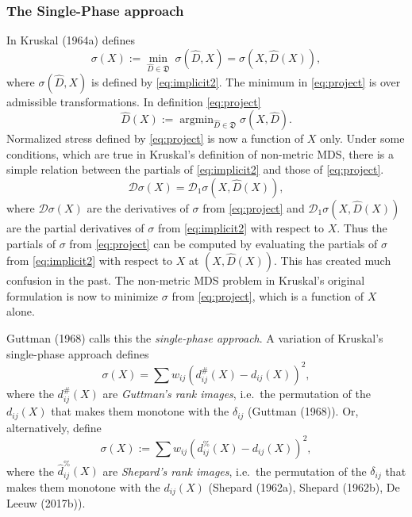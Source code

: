 \documentclass[
  12pt,
]{article}
\begin{document}
\subsubsection{The Single-Phase approach}\label{the-single-phase-approach}

In Kruskal (1964a) defines
\begin{equation}
\sigma(X):=\min_{\hat D\in\mathfrak{D}}\ \sigma(\hat D,X)=\sigma(X,\hat D(X)),
\label{eq:project}
\end{equation}
where \(\sigma(\hat D,X)\) is defined by
\eqref{eq:implicit2}. The minimum in \eqref{eq:project} is over admissible
transformations. In definition \eqref{eq:project}
\begin{equation}
\hat D(X):=\mathop{\text{argmin}}_{\hat D\in\mathfrak{D}}\sigma(X, \hat D).
\label{eq:optscal}
\end{equation}
Normalized stress defined by \eqref{eq:project} is now a
function of \(X\) only. Under some conditions, which are true in Kruskal's
definition of non-metric MDS, there is a simple relation between the
partials of \eqref{eq:implicit2} and those of \eqref{eq:project}.
\begin{equation}
\mathcal{D}\sigma(X)=\mathcal{D}_1\sigma(X,\hat D(X)),
\label{eq:partials}
\end{equation}
where \(\mathcal{D}\sigma(X)\) are the derivatives of
\(\sigma\) from \eqref{eq:project} and \(\mathcal{D}_1\sigma(X,\hat D(X))\)
are the partial derivatives of \(\sigma\) from \eqref{eq:implicit2} with
respect to \(X\). Thus the partials of \(\sigma\) from \eqref{eq:project} can
be computed by evaluating the partials of \(\sigma\) from
\eqref{eq:implicit2} with respect to \(X\) at \((X,\hat D(X))\). This has
created much confusion in the past. The non-metric MDS problem in Kruskal's original formulation is now to
minimize \(\sigma\) from \eqref{eq:project}, which is a function of \(X\)
alone.

Guttman (1968) calls this the \emph{single-phase approach}. A variation of
Kruskal's single-phase approach defines
\begin{equation}
\sigma(X)=\sum w_{ij}(d_{ij}^\#(X)-d_{ij}(X))^2,
\label{eq:rankimage}
\end{equation}
where the \(d_{ij}^\#(X)\) are \emph{Guttman's rank images}, i.e.~the
permutation of the \(d_{ij}(X)\) that makes them monotone with the
\(\delta_{ij}\) (Guttman (1968)). Or, alternatively, define
\begin{equation}
\sigma(X):=\sum   w_{ij}(d_{ij}^\%(X)-d_{ij}(X))^2,
\label{eq:shepard}
\end{equation}
where the \(\hat d_{ij}^\%(X)\) are \emph{Shepard's rank images}, i.e.~the
permutation of the \(\delta_{ij}\) that makes them monotone with the
\(d_{ij}(X)\) (Shepard (1962a), Shepard (1962b), De Leeuw (2017b)).
\end{document}
